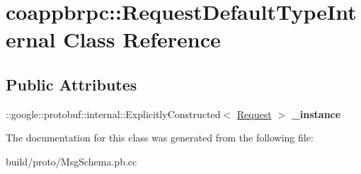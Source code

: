 \hypertarget{classcoappbrpc_1_1RequestDefaultTypeInternal}{}\section{coappbrpc\+:\+:Request\+Default\+Type\+Internal Class Reference}
\label{classcoappbrpc_1_1RequestDefaultTypeInternal}
\subsection*{Public Attributes}
\begin{DoxyCompactItemize}
\item 
\mbox{\label{classcoappbrpc_1_1RequestDefaultTypeInternal_a9e4ffe30bd0910a694598331fb695828}} 
\+::google\+::protobuf\+::internal\+::\+Explicitly\+Constructed$<$ \hyperlink{classcoappbrpc_1_1Request}{Request} $>$ {\bfseries \+\_\+instance}
\end{DoxyCompactItemize}


The documentation for this class was generated from the following file\+:\begin{DoxyCompactItemize}
\item 
build/proto/Msg\+Schema.\+pb.\+cc\end{DoxyCompactItemize}

